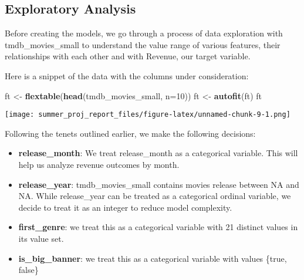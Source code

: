 \documentclass[
]{article}
\newenvironment{Shaded}{\begin{snugshade}}{\end{snugshade}}
\newcommand{\DataTypeTok}[1]{\textcolor[rgb]{0.13,0.29,0.53}{#1}}
\newcommand{\DecValTok}[1]{\textcolor[rgb]{0.00,0.00,0.81}{#1}}
\newcommand{\KeywordTok}[1]{\textcolor[rgb]{0.13,0.29,0.53}{\textbf{#1}}}
\newcommand{\NormalTok}[1]{#1}
\newcommand{\StringTok}[1]{\textcolor[rgb]{0.31,0.60,0.02}{#1}}
\providecommand{\tightlist}{%
  \setlength{\itemsep}{0pt}\setlength{\parskip}{0pt}}
\begin{document}
\hypertarget{exploratory-analysis}{%
\subsection{Exploratory Analysis}\label{exploratory-analysis}}

Before creating the models, we go through a process of data exploration
with tmdb\_movies\_small to understand the value range of various
features, their relationships with each other and with Revenue, our
target variable.

Here is a snippet of the data with the columns under consideration:

\begin{Shaded}
\begin{Highlighting}[]
\NormalTok{ft <-}\StringTok{ }\KeywordTok{flextable}\NormalTok{(}\KeywordTok{head}\NormalTok{(tmdb_movies_small, }\DataTypeTok{n=}\DecValTok{10}\NormalTok{))}
\NormalTok{ft <-}\StringTok{ }\KeywordTok{autofit}\NormalTok{(ft)}
\NormalTok{ft}
\end{Highlighting}
\end{Shaded}

\texttt{[image: summer\_proj\_report\_files/figure-latex/unnamed-chunk-9-1.png]}

Following the tenets outlined earlier, we make the following decisions:

\begin{itemize}
\tightlist
\item
  \textbf{release\_month}: We treat release\_month as a categorical
  variable. This will help us analyze revenue outcomes by month.
\item
  \textbf{release\_year}: tmdb\_movies\_small contains movies release
  between NA and NA. While release\_year can be treated as a categorical
  ordinal variable, we decide to treat it as an integer to reduce model
  complexity.
\item
  \textbf{first\_genre}: we treat this as a categorical variable with 21
  distinct values in its value set.
\item
  \textbf{is\_big\_banner}: we treat this as a categorical variable with
  values \{true, false\}
\end{itemize}
\end{document}
